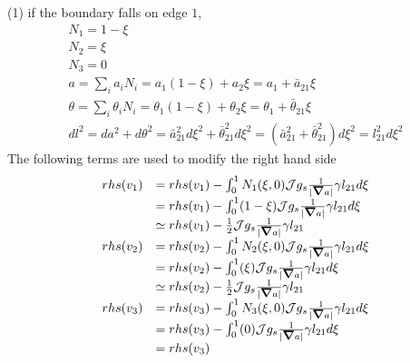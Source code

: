 \documentclass{report}
\newcommand{\bm}[1]{\mbox{\boldmath $#1$}}
\newcommand{\ff}[2]{\frac{#1}{#2}}
\begin{document}
(1) if the boundary falls on edge $1$,
$$
\begin{array}{l}
N_1=1-\xi\\
N_2=\xi\\
N_3=0 \\
a = \sum_i a_i N_i = a_1(1-\xi) + a_2 \xi = a_1 + \bar{a}_{21} \xi\\
\theta = \sum_i \theta_i N_i = \theta_1(1-\xi) + \theta_2 \xi = \theta_1 + \bar{\theta}_{21} \xi\\
dl^2 = da^2 + d\theta^2 
     = \bar{a}_{21}^2 d\xi^2 + \bar{\theta}_{21}^2 d\xi^2
     = (\bar{a}_{21}^2 + \bar{\theta}_{21}^2) d\xi^2
     = l_{21}^2 d\xi^2
\end{array}
$$
The following terms are used to modify the right hand side
$$
\begin{array}{ll}
rhs(v_1) & = rhs(v_1) - \int_0^1 N_1(\xi,0) {\cal J} g_s \ff{1}{|\bm{\nabla}a|} \gamma l_{21} d\xi \\
         & = rhs(v_1) - \int_0^1 (1-\xi) {\cal J} g_s \ff{1}{|\bm{\nabla}a|} \gamma l_{21} d\xi \\
         & \simeq rhs(v_1) - \ff{1}{2} {\cal J} g_s \ff{1}{|\bm{\nabla}a|} \gamma l_{21}
\\
rhs(v_2) & = rhs(v_2) - \int_0^1 N_2(\xi,0) {\cal J} g_s \ff{1}{|\bm{\nabla}a|} \gamma l_{21} d\xi \\
         & = rhs(v_2) - \int_0^1 (\xi) {\cal J} g_s \ff{1}{|\bm{\nabla}a|} \gamma l_{21} d\xi \\
         & \simeq rhs(v_2) - \ff{1}{2} {\cal J} g_s \ff{1}{|\bm{\nabla}a|} \gamma l_{21}
\\
rhs(v_3) & = rhs(v_3) - \int_0^1 N_3(\xi,0) {\cal J} g_s \ff{1}{|\bm{\nabla}a|} \gamma l_{21} d\xi \\
         & = rhs(v_3) - \int_0^1 (0) {\cal J} g_s \ff{1}{|\bm{\nabla}a|} \gamma l_{21} d\xi \\
         & = rhs(v_3)
\end{array}
$$
\end{document}

